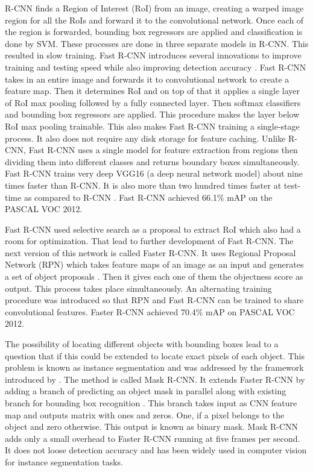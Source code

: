 \documentclass[11pt]{article}
\begin{document}
R-CNN finds a Region of Interest (RoI) from an image, creating a warped image region for all the RoIs and forward it to the convolutional network. Once each of the region is forwarded, bounding box regressors are applied and classification is done by SVM. These processes are done in three separate models in R-CNN. This resulted in slow training. Fast R-CNN introduces several innovations to improve training and testing speed while also improving detection accuracy \cite{girshick2015fast}. Fast R-CNN takes in an entire image and forwards it to convolutional network to create a feature map. Then it determines RoI and on top of that it applies a single layer of RoI max pooling followed by a fully connected layer. Then softmax classifiers and bounding box regressors are applied. This procedure makes the layer below RoI max pooling trainable. This also makes Fast R-CNN training a single-stage process. It also does not require any disk storage for feature caching. Unlike R-CNN, Fast R-CNN uses a single model for feature extraction from regions then dividing them into different classes and returns boundary boxes simultaneously. Fast R-CNN trains very deep VGG16 (a deep neural network model) about nine times faster than R-CNN. It is also more than two hundred times faster at test-time as compared to R-CNN \cite{girshick2015fast}. Fast R-CNN achieved 66.1\% mAP on the PASCAL VOC 2012.

Fast R-CNN used selective search as a proposal to extract RoI which also had a room for optimization. That lead to further development of Fast R-CNN. The next version of this network is called Faster R-CNN. It uses Regional Proposal Network (RPN) which takes feature maps of an image as an input and generates a set of object proposals \cite{ren2015faster}. Then it gives each one of them the objectness score as output. This process takes place simultaneously. An alternating training procedure was introduced so that RPN and Fast R-CNN can be trained to share convolutional features. Faster R-CNN achieved 70.4\% mAP on PASCAL VOC 2012.

The possibility of locating different objects with bounding boxes lead to a question that if this could be extended to locate exact pixels of each object. This problem is known as instance segmentation and was addressed by the framework introduced by \cite{he2017mask}. The method is called Mask R-CNN. It extends Faster R-CNN by adding a branch of predicting an object mask in parallel along with existing branch for bounding box recognition \cite{he2017mask}. This branch takes input as CNN feature map and outputs matrix with ones and zeros. One, if a pixel belongs to the object and zero otherwise. This output is known as binary mask. Mask R-CNN adds only a small overhead to Faster R-CNN running at five frames per second. It does not loose detection accuracy and has been widely used in computer vision for instance segmentation tasks.
\end{document}
